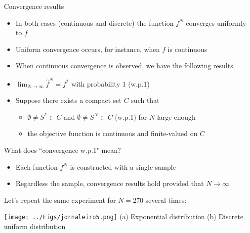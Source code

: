 \begin{frame}{Convergence results}



\begin{itemize}
\item In both cases (continuous and discrete) the function  $f^N$ converges uniformly to $f$
\pula

\item Uniform convergence occurs, for instance, when $f$ is continuous
\pula

\item When continuous convergence is observed, we have the following results
\end{itemize}

\begin{theorem}

\begin{itemize}
\item $\lim_{N \to \infty} \hat f^N = f^*$ with probability 1 (w.p.1)
\pula
\item Suppose there exists a compact set $C$ such that
\begin{itemize}
\item $\emptyset\neq S^* \subset  C$ and $\emptyset\neq S^N \subset  C$ (w.p.1) for $N$ large enough
\item the objective function is continuous and finite-valued on $C$
\end{itemize}
\pula
{}
\end{itemize}
\end{theorem}
 \end{frame}


\begin{frame}{What does ``convergence w.p.1" mean?}

\begin{itemize}
\item  Each function  $f^N$ is constructed with a single sample
\pula
\item Regardless the sample,  convergence results hold provided that $N \to \infty$
\end{itemize}
\pula
Let's repeat the same experiment for $N=270$ several times:


\begin{center}
\texttt{[image: ../Figs/jornaleiro5.png]} {}
{\small
(a) Exponential distribution \quad \quad (b) Discrete uniform distribution}
\end{center}
 \end{frame}



